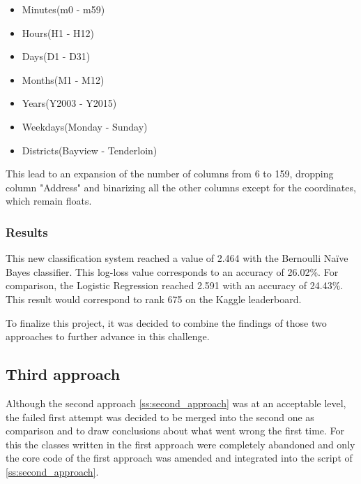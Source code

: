 \documentclass[12pt,a4paper]{scrartcl}
\begin{document}
\begin{itemize}
\item Minutes(m0 - m59)
\item Hours(H1 - H12)
\item Days(D1 - D31)
\item Months(M1 - M12)
\item Years(Y2003 - Y2015)
\item Weekdays(Monday - Sunday)
\item Districts(Bayview - Tenderloin)
\end{itemize}







This lead to an expansion of the number of columns from 6 to 159, dropping column "Address" and binarizing all the other columns except for the coordinates, which remain floats.

\subsubsection{Results}\label{sss:results2}
This new classification system reached a value of 2.464 with the Bernoulli Naïve Bayes classifier. This log-loss value corresponds to an accuracy of 26.02\%. For comparison, the Logistic Regression reached 2.591 with an accuracy of 24.43\%. This result would correspond to rank 675 on the Kaggle leaderboard.

To finalize this project, it was decided to combine the findings of those two approaches to further advance in this challenge.

\pagebreak
\subsection{Third approach}\label{ss:third_approach}
Although the second approach \ref{ss:second_approach} was at an acceptable level, the failed first attempt was decided to be merged into the second one as comparison and to draw conclusions about what went wrong the first time. For this the classes written in the first approach were completely abandoned and only the core code of the first approach was amended and integrated into the script of \ref{ss:second_approach}.
\end{document}
